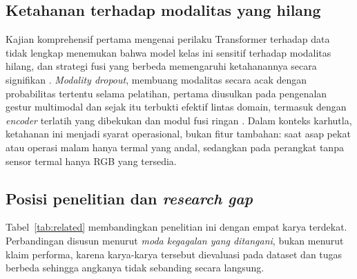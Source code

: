 \subsection{Ketahanan terhadap modalitas yang hilang}

Kajian komprehensif pertama mengenai perilaku Transformer terhadap data tidak
lengkap menemukan bahwa model kelas ini sensitif terhadap modalitas hilang, dan
strategi fusi yang berbeda memengaruhi ketahanannya secara signifikan
\cite{ma2022}. \emph{Modality dropout}, membuang modalitas secara acak dengan
probabilitas tertentu selama pelatihan, pertama diusulkan pada pengenalan
gestur multimodal \cite{neverova2016} dan sejak itu terbukti efektif lintas
domain, termasuk dengan \emph{encoder} terlatih yang dibekukan dan modul fusi
ringan \cite{dropout2025}. Dalam konteks karhutla, ketahanan ini menjadi syarat
operasional, bukan fitur tambahan: saat asap pekat atau operasi malam hanya
termal yang andal, sedangkan pada perangkat tanpa sensor termal hanya RGB yang
tersedia.

\subsection{Posisi penelitian dan \emph{research gap}}

Tabel~\ref{tab:related} membandingkan penelitian ini dengan empat karya terdekat.
Perbandingan disusun menurut \emph{moda kegagalan yang ditangani}, bukan menurut
klaim performa, karena karya-karya tersebut dievaluasi pada dataset dan tugas
berbeda sehingga angkanya tidak sebanding secara langsung.

